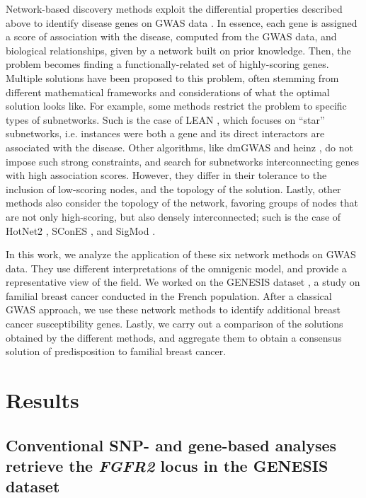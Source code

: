 \documentclass[10pt,letterpaper]{article}
\begin{document}
Network-based discovery methods exploit the differential properties described above to identify disease genes on GWAS data \cite{azencott_network-guided_2016}. In essence, each gene is assigned a score of association with the disease, computed from the GWAS data, and biological relationships, given by a network built on prior knowledge. Then, the problem becomes finding a functionally-related set of highly-scoring genes. Multiple solutions have been proposed to this problem, often stemming from different mathematical frameworks and considerations of what the optimal solution looks like. For example, some methods restrict the problem to specific types of subnetworks. Such is the case of LEAN \cite{gwinner_network-based_2016}, which focuses on ``star'' subnetworks, i.e. instances were both a gene and its direct interactors are associated with the disease. Other algorithms, like dmGWAS \cite{jia_dmgwas:_2011} and heinz \cite{dittrich_identifying_2008}, do not impose such strong constraints, and search for subnetworks interconnecting genes with high association scores. However, they differ in their tolerance to the inclusion of low-scoring nodes, and the topology of the solution. Lastly, other methods also consider the topology of the network, favoring groups of nodes that are not only high-scoring, but also densely interconnected; such is the case of HotNet2 \cite{leiserson_pan-cancer_2015}, SConES \cite{azencott_efficient_2013}, and SigMod \cite{liu_sigmod:_2017}.

In this work, we analyze the application of these six network methods on GWAS data. They use different interpretations of the omnigenic model, and provide a representative view of the field. We worked on the GENESIS dataset \cite{sinilnikova_genesis:_2016}, a study on familial breast cancer conducted in the French population. After a classical GWAS approach, we use these network methods to identify additional breast cancer susceptibility genes. Lastly, we carry out a comparison of the solutions obtained by the different methods, and aggregate them to obtain a consensus solution of predisposition to familial breast cancer. 

\section{Results}

\subsection{Conventional SNP- and gene-based analyses retrieve the \emph{FGFR2} locus in the GENESIS dataset}
\label{results:conventional}
\end{document}
